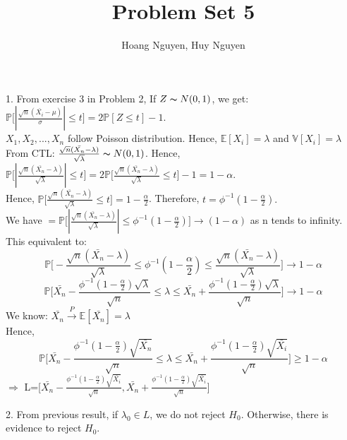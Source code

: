 \documentclass[10pt]{article}
\newenvironment{problem}[2][Problem]{\begin{trivlist}
\item[\hskip \labelsep {\bfseries #1}\hskip \labelsep {\bfseries #2.}]}{\end{trivlist}}
\begin{document}
\title{Problem Set 5}
\author{Hoang Nguyen, Huy Nguyen}
\maketitle
    
\begin{problem}{1}
\item 1.
From exercise 3 in Problem 2, If $Z \thicksim N(0,1)$, we get: $\mathbb{P}\Big[|\frac{\sqrt{n}(\bar{X_i}-\mu)}{\sigma}| \leqslant t\Big]=2\mathbb{P}[Z \leqslant t]-1$.\\
$X_1, X_2,...,X_n$ follow Poisson distribution. Hence, $\mathbb{E}[X_i]=\lambda$ and $\mathbb{V}[X_i]=\lambda$\\
From CTL: $\frac{\sqrt{n}(\bar{X_n}-\lambda)}{\sqrt{\lambda}} \thicksim N(0,1)$. Hence, $\mathbb{P}\Big [ |\frac{\sqrt{n}(\bar{X_n}-\lambda)}{\sqrt{\lambda}}| \leqslant t \Big]=2\mathbb{P}\Big [ \frac{\sqrt{n}(\bar{X_n}-\lambda)}{\sqrt{\lambda}} \leqslant t \Big ]-1=1-\alpha.$\\
Hence, $\mathbb{P}\Big [ \frac{\sqrt{n}(\bar{X_n}-\lambda)}{\sqrt{\lambda}} \leqslant t \Big ]=1- \frac{\alpha}{2}$. Therefore, $t=\phi^{-1}(1- \frac{\alpha}{2}).$\\
We have $ = \mathbb{P}\Big [ |\frac{\sqrt{n}(\bar{X_n}-\lambda)}{\sqrt{\lambda}}| \leqslant \phi^{-1}(1- \frac{\alpha}{2}) \Big ]\rightarrow (1-\alpha)$ as n tends to infinity. This equivalent to:
\[  \mathbb{P}\Big[-\frac{\sqrt{n}(\bar{X_n}-\lambda)}{\sqrt{\lambda}} \leqslant \phi^{-1}(1- \frac{\alpha}{2}) \leqslant \frac{\sqrt{n}(\bar{X_n}-\lambda)}{\sqrt{\lambda}}\Big] \rightarrow 1-\alpha\] 
\[ \mathbb{P}\Big[\bar{X_n}- \frac{\phi^{-1}(1- \frac{\alpha}{2})\sqrt{\lambda}}{\sqrt{n}} \leqslant \lambda \leqslant \bar{X_n}+ \frac{\phi^{-1}(1- \frac{\alpha}{2})\sqrt{\lambda}}{\sqrt{n}}  \Big] \rightarrow 1- \alpha\]
We know: $\bar{X_n} \xrightarrow{P} \mathbb{E}[\bar{X_n}]=\lambda$\\
Hence, 
\[ \mathbb{P}\Big[\bar{X_n}- \frac{\phi^{-1}(1- \frac{\alpha}{2})\sqrt{\bar{X_n}}}{\sqrt{n}} \leqslant \lambda \leqslant \bar{X_n}+ \frac{\phi^{-1}(1- \frac{\alpha}{2})\sqrt{\bar{X_i}}}{\sqrt{n}}  \Big] \geqslant 1- \alpha\]
$\Rightarrow$ L=[$\bar{X_n}- \frac{\phi^{-1}(1- \frac{\alpha}{2})\sqrt{\bar{X_i}}}{\sqrt{n}}, \bar{X_n}+ \frac{\phi^{-1}(1- \frac{\alpha}{2})\sqrt{\bar{X_i}}}{\sqrt{n}}$]


\item 2. 
From previous result, if $\lambda_0 \in L$, we do not reject $H_0$. Otherwise, there is evidence to reject $H_0$.

















\end{problem}
\end{document}
